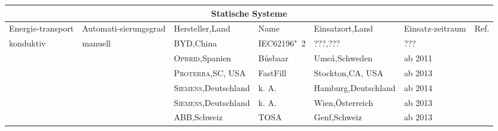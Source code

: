 \begin{table}\centering %
	\begin{tabularx}{\linewidth}{p{1.5cm}p{1.9cm}p{2.2cm}Xp{2.4cm}p{1.2cm}l}
		                                                                                       \multicolumn{7}{c}{\textbf{Statische Systeme}}                                                                                         \\ \toprule
		Energie-transport                & Automati-sierungsgrad         & Hersteller,\newline Land                         & Name        & Einsatzort,\newline Land        & Einsatz-zeitraum & Ref.                                 \\ \midrule
		\multirow{14}{*}{konduktiv}      & \multirow{2}{*}{manuell}      & \textsc{BYD},\newline China                      & IEC62196"~2 & ???,\newline ???                & ???              & \cite{bydSpecs}                      \\
		\cmidrule{2-7}                   & \multirow{12}{*}{automatisch} & \textsc{Opbrid},\newline Spanien                 & Bůsbaar     & Umeå,\newline Schweden          & ab 2011          & \cite{SchKonLade}                    \\
		                                 &                               & \textsc{Proterra,\newline SC, USA}               & FastFill    & Stockton,\newline CA, USA       & ab 2013          & \cite{protCat}                       \\
		                                 &                               & \textsc{Siemens},\newline Deutschland            & k. A.       & Hamburg,\newline Deutschland    & ab 2014          & \cite{siemensHamburg}                \\
		                                 &                               & \textsc{Siemens},\newline Deutschland            & k. A.       & Wien,\newline Österreich        & ab 2013          & \cite{SiemensWien}                   \\
		                                 &                               & \textsc{ABB},\newline Schweiz                    & TOSA        & Genf,\newline Schweiz           & ab 2013          & \cite{tosa}                          \\

\end{tabularx}
\end{table}
